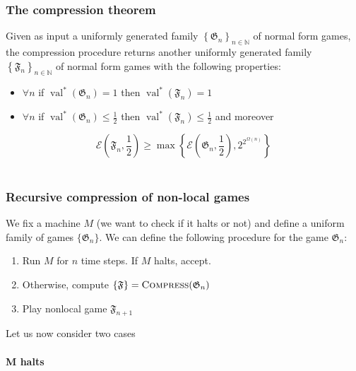\subsubsection{The compression theorem}
\begin{theorem}\label{th:compression}
     Given as input a uniformly generated family $\left\{\mathfrak{G}_{n}\right\}_{n \in \mathbb{N}}$ of normal form games, the compression procedure returns another uniformly generated family $\left\{\mathfrak{F}_{n}\right\}_{n \in \mathbb{N}}$ of normal form games with the following properties: 
     \begin{itemize}
     \item $\forall n$ if $\operatorname{val}^{*}\left(\mathfrak{G}_{{n}}\right)=1$ then $\operatorname{val}^{*}\left(\mathfrak{F}_{n}\right)=1$
        \item  $\forall n$ if $\operatorname{val}^{*}\left(\mathfrak{G}_{{n}}\right) \leq \frac{1}{2}$ then $\operatorname{val}^{*}\left(\mathfrak{F}_{n}\right) \leq \frac{1}{2}$ and moreover
     \end{itemize}
    \begin{equation}
    \mathscr{E}\left(\mathfrak{F}_{n}, \frac{1}{2}\right) \geq \max \left\{\mathscr{E}\left(\mathfrak{G}_{{n}}, \frac{1}{2}\right), 2^{2^{\Omega(n)}}\right\}
    \end{equation}~\cite{mipre}
\end{theorem}
\subsubsection{Recursive compression of non-local games}
We fix a machine $M$ (we want to check if it halts or not) and define a uniform family of games $\{\mathfrak{G}_n\}$.
We can define the following procedure for the game $\mathfrak{G}_{n}$:

\begin{enumerate}
\item Run $M$ for $n$ time steps. If $M$ halts, accept.
\item Otherwise, compute $\{\mathfrak{F}\}= \textsc{Compress}({\mathfrak{G}_n})$
\item  Play nonlocal game $\mathfrak{F}_{n+1}$
\end{enumerate}

Let us now consider two cases 

\paragraph{M halts}

